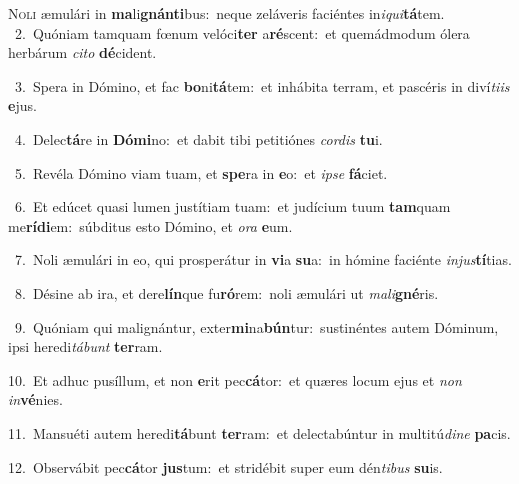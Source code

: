 \lettrine{\initial\textcolor{\initialcolor}{N}}{oli} æmulári in \textbf{ma}\-li\-\textbf{gnán}\-\textbf{ti}bus:~\star neque zeláveris faciéntes in\-\textit{i}\-\textit{qui}\textbf{tá}tem.\\
{\numbfont\textcolor{\numbcolor}{~2.}}~Quóniam tamquam fœnum velóci\textbf{ter} a\-\textbf{ré}\-scent:~\star et quemádmodum ólera herbárum \textit{ci}\-\textit{to} \textbf{dé}\-cident.\par
{\numbfont\textcolor{\numbcolor}{~3.}}~Spera in Dómino, et fac \textbf{bo}\-ni\-\textbf{tá}\-tem:~\star et inhábita terram, et pascéris in diví\-\textit{ti}\-\textit{is} \textbf{e}\-jus.\par
{\numbfont\textcolor{\numbcolor}{~4.}}~Delec\-\textbf{tá}\-re in \textbf{Dó}\-\textbf{mi}no:~\star et dabit tibi petitiónes \textit{cor}\-\textit{dis} \textbf{tu}\-i.\par
{\numbfont\textcolor{\numbcolor}{~5.}}~Revéla Dómino viam tuam, et \textbf{spe}\-ra in \textbf{e}\-o:~\star et \textit{ip}\-\textit{se} \textbf{fá}\-ciet.\par
{\numbfont\textcolor{\numbcolor}{~6.}}~Et edúcet quasi lumen justítiam tuam:~\dagger et judícium tuum \textbf{tam}\-quam me\-\textbf{rí}\-\textbf{di}em:~\star súbditus esto Dómino, et \textit{o}\-\textit{ra} \textbf{e}\-um.\par
{\numbfont\textcolor{\numbcolor}{~7.}}~Noli æmulári in eo, qui prosperátur in \textbf{vi}\-a \textbf{su}\-a:~\star in hómine faciénte \textit{in}\-\textit{jus}\textbf{tí}tias.\par
{\numbfont\textcolor{\numbcolor}{~8.}}~Désine ab ira, et dere\-\textbf{lín}\-que fu\-\textbf{ró}\-rem:~\star noli æmulári ut \textit{ma}\-\textit{li}\textbf{gné}ris.\par
{\numbfont\textcolor{\numbcolor}{~9.}}~Quóniam qui malignántur, exter\-\textbf{mi}\-na\-\textbf{bún}\-tur:~\star sustinéntes autem Dóminum, ipsi heredi\-\textit{tá}\-\textit{bunt} \textbf{ter}\-ram.\par
{\numbfont\textcolor{\numbcolor}{10.}}~Et adhuc pusíllum, et non \textbf{e}\-rit pec\-\textbf{cá}\-tor:~\star et quæres locum ejus et \textit{non} \textit{in}\-\textbf{vé}nies.\par
{\numbfont\textcolor{\numbcolor}{11.}}~Mansuéti autem heredi\-\textbf{tá}\-bunt \textbf{ter}\-ram:~\star et delectabúntur in multitú\-\textit{di}\-\textit{ne} \textbf{pa}\-cis.\par
{\numbfont\textcolor{\numbcolor}{12.}}~Observábit pec\-\textbf{cá}\-tor \textbf{jus}\-tum:~\star et stridébit super eum dén\-\textit{ti}\-\textit{bus} \textbf{su}\-is.\par
